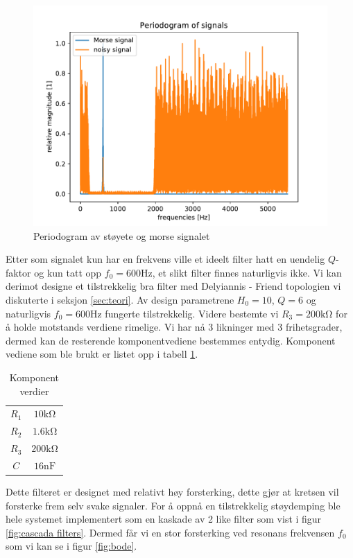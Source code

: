 \documentclass[a4paper,11pt,norsk]{article}
\begin{document}
\begin{figure}
\centering
	\includegraphics[]{esda_eksamen_init_sp.pdf}
	\caption{Periodogram av støyete og morse signalet}
\centering
\label{fig:init_sp}
\end{figure}

Etter som signalet kun har en frekvens ville et ideelt filter hatt en uendelig $Q$-faktor og kun tatt opp $f_0=600\si{\hertz}$, et slikt filter finnes naturligvis ikke. Vi kan derimot designe et tilstrekkelig bra filter med Delyiannis - Friend topologien vi diskuterte i seksjon \ref{sec:teori}. Av design parametrene $H_0=10$, $Q=6$ og naturligvis $f_0=600\si{\hertz}$ fungerte tilstrekkelig. Videre bestemte vi $R_3=200\si{\kilo\ohm}$ for å holde motstands verdiene rimelige. Vi har nå 3 likninger med 3 frihetsgrader, dermed kan de resterende komponentvediene bestemmes entydig. Komponent vediene som ble brukt er listet opp i tabell \ref{tab:comp_vals}. 


\begin{table}[]
    \centering
    \begin{tabular}{c|c}
      $R_1$   & $10\si{\kilo\ohm}$ \\
       $R_2$  & $1.6\si{\kilo\ohm}$\\
       $R_3$ & $200\si{\kilo\ohm}$\\
       $C$ & $16\si{\nano\farad}$\\
    \end{tabular}
    \caption{Komponent verdier}
    \label{tab:comp_vals}
\end{table}

Dette filteret er designet med relativt høy forsterking, dette gjør at kretsen vil forsterke frem selv svake signaler. For å oppnå en tilstrekkelig støydemping ble hele systemet implementert som en kaskade av 2 like filter som vist i figur \ref{fig:cascada filters}. Dermed får vi en stor forsterking ved resonans frekvensen $f_0$ som vi kan se i figur \ref{fig:bode}. 
\end{document}
